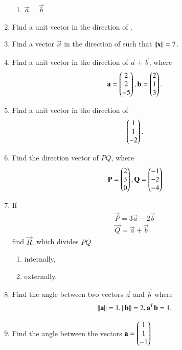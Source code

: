 \begin{enumerate}[label=\arabic*.,ref=\thesubsection.\theenumi]
\begin{enumerate}
\item $\vec{a}=\vec{b}$
\end{enumerate}
%
\item Find a unit vector in the  direction of .
%
\item Find a vector $\vec{x}$ in the direction of  such that $\left\lVert\mathbf{x}\right\rVert = 7$.
%
\item Find a unit vector in the direction of $\vec{a}+\vec{b}$, where 
%
\begin{align}
\mathbf{a} = \begin{pmatrix}2\\2\\-5\end{pmatrix}, \mathbf{b} = \begin{pmatrix}2\\1\\3\end{pmatrix}.
\end{align}
%
\item Find a unit vector in the direction of 
%
\begin{align}
\begin{pmatrix}1\\1\\-2\end{pmatrix}.
\end{align}
%
\item Find the direction vector of $PQ$, where 
\begin{align}
\mathbf{P} = \begin{pmatrix}2\\3\\0\end{pmatrix},
\mathbf{Q} = \begin{pmatrix}-1\\-2\\-4\end{pmatrix}
\end{align}
%
\item If 
\begin{align}
\vec{P} = 3\vec{a}-2\vec{b}
\\
\vec{Q} = \vec{a}+\vec{b}
\end{align}
%
find $\vec{R}$, which divides $PQ$ 
\begin{enumerate}
\item internally,
\item externally.
\end{enumerate}
%
\item Find the angle between two vectors $\vec{a}$ and $\vec{b}$ where 
%
\begin{align}
\left\lVert\mathbf{a}\right\rVert = 1,
\left\lVert\mathbf{b}\right\rVert = 2,
\mathbf{a}^T\mathbf{b} = 1.
\end{align}
%
\item Find the angle between the vectors 
$\mathbf{a}=\begin{pmatrix}1\\1\\-1\end{pmatrix}$

\end{enumerate}
